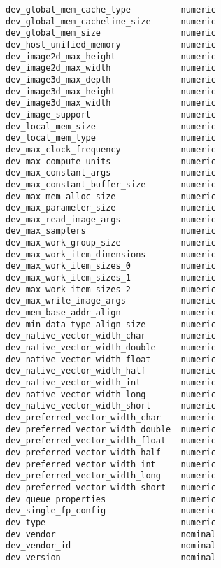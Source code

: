 \begin{multicols}{2}
\begin{Verbatim}[fontsize=\footnotesize]
dev_global_mem_cache_type          numeric
dev_global_mem_cacheline_size      numeric
dev_global_mem_size                numeric
dev_host_unified_memory            numeric
dev_image2d_max_height             numeric
dev_image2d_max_width              numeric
dev_image3d_max_depth              numeric
dev_image3d_max_height             numeric
dev_image3d_max_width              numeric
dev_image_support                  numeric
dev_local_mem_size                 numeric
dev_local_mem_type                 numeric
dev_max_clock_frequency            numeric
dev_max_compute_units              numeric
dev_max_constant_args              numeric
dev_max_constant_buffer_size       numeric
dev_max_mem_alloc_size             numeric
dev_max_parameter_size             numeric
dev_max_read_image_args            numeric
dev_max_samplers                   numeric
dev_max_work_group_size            numeric
dev_max_work_item_dimensions       numeric
dev_max_work_item_sizes_0          numeric
dev_max_work_item_sizes_1          numeric
dev_max_work_item_sizes_2          numeric
dev_max_write_image_args           numeric
dev_mem_base_addr_align            numeric
dev_min_data_type_align_size       numeric
dev_native_vector_width_char       numeric
dev_native_vector_width_double     numeric
dev_native_vector_width_float      numeric
dev_native_vector_width_half       numeric
dev_native_vector_width_int        numeric
dev_native_vector_width_long       numeric
dev_native_vector_width_short      numeric
dev_preferred_vector_width_char    numeric
dev_preferred_vector_width_double  numeric
dev_preferred_vector_width_float   numeric
dev_preferred_vector_width_half    numeric
dev_preferred_vector_width_int     numeric
dev_preferred_vector_width_long    numeric
dev_preferred_vector_width_short   numeric
dev_queue_properties               numeric
dev_single_fp_config               numeric
dev_type                           numeric
dev_vendor                         nominal
dev_vendor_id                      nominal
dev_version                        nominal
\end{Verbatim}
\end{multicols}

